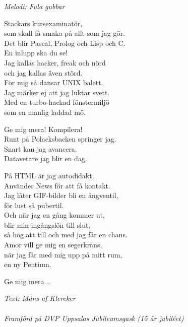 {\footnotesize\textit{Melodi: Fula gubbar}}\par
\vspace{10pt}
Stackars kursexaminatör,\\
som skall få smaka på allt som jag gör.\\
Det blir Pascal, Prolog och Lisp och C.\\
En inlupp ska du se!\\
Jag kallas hacker, freak och nörd\\
och jag kallas även störd.\\
För mig så dansar UNIX balett.\\
Jag märker ej att jag luktar svett.\\
Med en turbo-hackad fönstermiljö\\
som en manlig laddad mö.\par
\vspace{10pt}
Ge mig mera! Kompilera!\\
Runt på Polacksbacken springer jag.\\
Snart kan jag avancera.\\
Datavetare jag blir en dag.\par
\newpage
På HTML är jag autodidakt.\\
Använder News för att få kontakt.\\
Jag låter GIF-bilder bli en ångventil,\\
för lust så pubertil.\\
Och när jag en gång kommer ut,\\
blir min ingångslön till slut,\\
så hög att till och med jag får en chans.\\
Amor vill ge mig en segerkrans,\\
när jag får med mig upp på mitt rum,\\
en ny Pentium.\par
\vspace{10pt}
Ge mig mera...\par
\vspace{10pt}
{\footnotesize\textit{Text: Måns af Klercker\\ \\ Framförd på DVP
      Uppsalas Jubileumsgask (15 år jubiléet)}}
